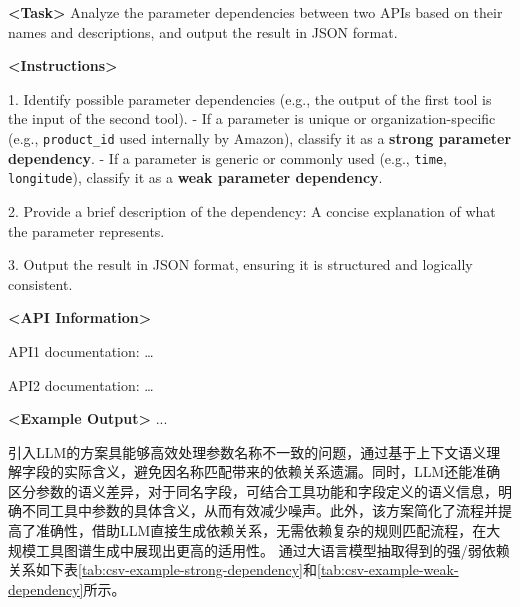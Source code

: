 
\begin{table}[H]
    \centering
    \label{tab:analyze_api_dependencies} %
    \begin{tcolorbox}[colback=bgcolor, colframe=black, width=0.95\textwidth, boxrule=0.5mm, 
    coltitle=white, colbacktitle=titlecolor, title=Task: Analyze API Dependencies]
    
    \textbf{<Task>} Analyze the parameter dependencies between two APIs based on their names and descriptions, and output the result in JSON format.
    
    \textbf{<Instructions>}

    1. Identify possible parameter dependencies (e.g., the output of the first tool is the input of the second tool).  
       - If a parameter is unique or organization-specific (e.g., \texttt{product\_id} used internally by Amazon), classify it as a \textbf{strong parameter dependency}.  
       - If a parameter is generic or commonly used (e.g., \texttt{time}, \texttt{longitude}), classify it as a \textbf{weak parameter dependency}. 

    2. Provide a brief description of the dependency: A concise explanation of what the parameter represents.  

    3. Output the result in JSON format, ensuring it is structured and logically consistent.  
    
    \vspace{0.5em}
    
    \textbf{<API Information>} 

    API1 documentation: \dots

    API2 documentation: \dots 
    
    \vspace{0.5em}
    
    \textbf{<Example Output>}  
    ...
    
    \end{tcolorbox}
\end{table}


引入LLM的方案具能够高效处理参数名称不一致的问题，通过基于上下文语义理解字段的实际含义，避免因名称匹配带来的依赖关系遗漏。同时，LLM还能准确区分参数的语义差异，对于同名字段，可结合工具功能和字段定义的语义信息，明确不同工具中参数的具体含义，从而有效减少噪声。此外，该方案简化了流程并提高了准确性，借助LLM直接生成依赖关系，无需依赖复杂的规则匹配流程，在大规模工具图谱生成中展现出更高的适用性。
通过大语言模型抽取得到的强/弱依赖关系如下表\ref{tab:csv-example-strong-dependency}和\ref{tab:csv-example-weak-dependency}所示。

